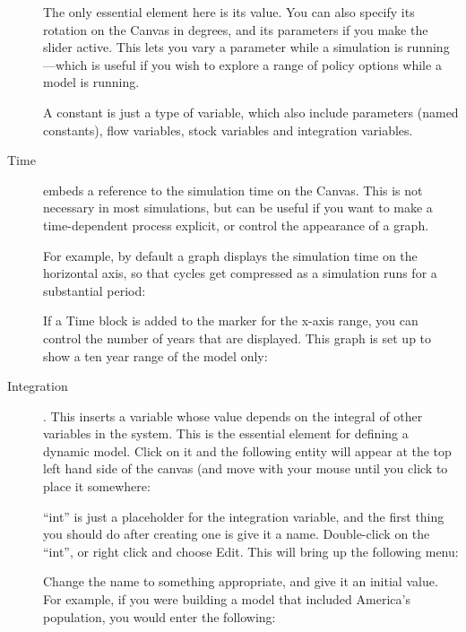 \begin{description}
The only essential element here is its
value. You can also specify its rotation on the Canvas in degrees, and
its parameters if you make the slider active. This lets you vary a
parameter while a simulation is running---which is useful if you wish
to explore a range of policy options while a model is running.

A constant is just a type of variable, which also include parameters
(named constants), flow variables, stock variables and integration variables.

\item[Time]  embeds a reference to the
simulation time on the Canvas. This is not necessary in most
simulations, but can be useful if you want to make a time-dependent
process explicit, or control the appearance of a graph. 

For example, by default a graph displays the simulation time on the
horizontal axis, so that cycles get compressed as a simulation runs
for a substantial period:


If a Time block is added to the marker for the x-axis range, you can
control the number of years that are displayed. This graph is set up
to show a ten year range of the model only: 




\item[Integration] .\label{Integrate}
  This inserts a variable whose value depends on the integral of other
  variables in the system. This is the essential element for defining
  a dynamic model. Click on it and the following entity will appear at
  the top left hand side of the canvas (and move with your mouse until
  you click to place it somewhere:

\begin{center}
\end{center}

``int'' is just a placeholder for the integration variable, and the first thing you should do after creating one is give it a name. Double-click on the ``int'', or right click and choose Edit. This will bring up the following menu:

\begin{center}
\end{center}

Change the name to something appropriate, and give it an initial
value. For example, if you were building a model that included
America's population, you would enter the following:


\end{description}
